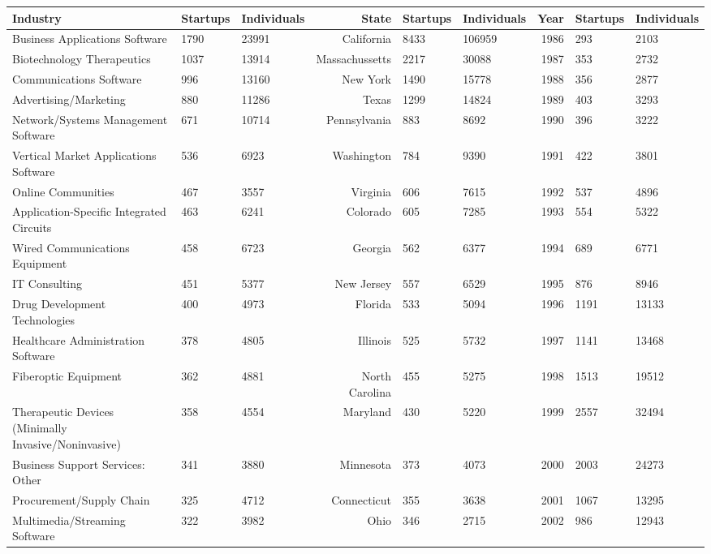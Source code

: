 \begin{table}[!htb]
\centering
\begingroup\scriptsize
\begin{tabular}{p{4.5cm}llrllrll}
  \toprule
Industry & Startups & Individuals & State & Startups & Individuals & Year & Startups & Individuals \\ 
  \midrule
Business Applications Software & 1790 & 23991 & California & 8433 & 106959 & 1986 & 293 & 2103 \\ 
  Biotechnology Therapeutics & 1037 & 13914 & Massachussetts & 2217 & 30088 & 1987 & 353 & 2732 \\ 
  Communications Software & 996 & 13160 & New York & 1490 & 15778 & 1988 & 356 & 2877 \\ 
  Advertising/Marketing & 880 & 11286 & Texas & 1299 & 14824 & 1989 & 403 & 3293 \\ 
  Network/Systems Management Software & 671 & 10714 & Pennsylvania & 883 & 8692 & 1990 & 396 & 3222 \\ 
  Vertical Market Applications Software & 536 & 6923 & Washington & 784 & 9390 & 1991 & 422 & 3801 \\ 
  Online Communities & 467 & 3557 & Virginia & 606 & 7615 & 1992 & 537 & 4896 \\ 
  Application-Specific Integrated Circuits & 463 & 6241 & Colorado & 605 & 7285 & 1993 & 554 & 5322 \\ 
  Wired Communications Equipment & 458 & 6723 & Georgia & 562 & 6377 & 1994 & 689 & 6771 \\ 
  IT Consulting & 451 & 5377 & New Jersey & 557 & 6529 & 1995 & 876 & 8946 \\ 
  Drug Development Technologies & 400 & 4973 & Florida & 533 & 5094 & 1996 & 1191 & 13133 \\ 
  Healthcare Administration Software & 378 & 4805 & Illinois & 525 & 5732 & 1997 & 1141 & 13468 \\ 
  Fiberoptic Equipment & 362 & 4881 & North Carolina & 455 & 5275 & 1998 & 1513 & 19512 \\ 
  Therapeutic Devices (Minimally Invasive/Noninvasive) & 358 & 4554 & Maryland & 430 & 5220 & 1999 & 2557 & 32494 \\ 
  Business Support Services: Other & 341 & 3880 & Minnesota & 373 & 4073 & 2000 & 2003 & 24273 \\ 
  Procurement/Supply Chain & 325 & 4712 & Connecticut & 355 & 3638 & 2001 & 1067 & 13295 \\ 
  Multimedia/Streaming Software & 322 & 3982 & Ohio & 346 & 2715 & 2002 & 986 & 12943 \\ 

\end{tabular}
\end{table}
